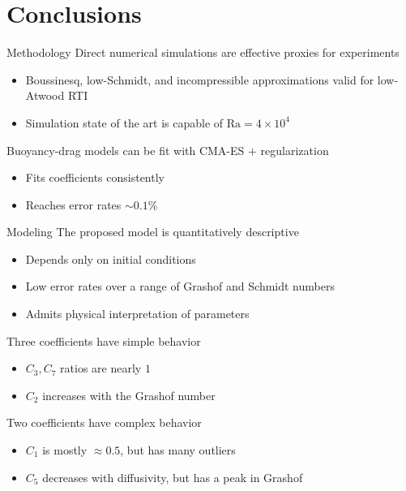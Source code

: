 \documentclass[12pt]{beamer}
\begin{document}
\section{Conclusions}
\begin{frame}{Methodology}
Direct numerical simulations are effective proxies for experiments
\begin{itemize}
  \item Boussinesq, low-Schmidt, and incompressible approximations valid for low-Atwood RTI
  \item Simulation state of the art is capable of $\text{Ra} = 4 \times 10^{4}$
\end{itemize}
\vspace{10pt} \pause

Buoyancy-drag models can be fit with CMA-ES $+$ regularization
\begin{itemize}
  \item Fits coefficients consistently
  \item Reaches error rates $\sim 0.1 \%$
\end{itemize}
\end{frame}

\begin{frame}{Modeling}
The proposed model is quantitatively descriptive
\begin{itemize}
  \item Depends only on initial conditions
  \item Low error rates over a range of Grashof and Schmidt numbers
  \item Admits physical interpretation of parameters
\end{itemize}

Three coefficients have simple behavior
\begin{itemize}
  \item $C_3, C_7$ ratios are nearly $1$
  \item $C_2$ increases with the Grashof number
\end{itemize}

Two coefficients have complex behavior
\begin{itemize}
  \item $C_1$ is mostly $\approx 0.5$, but has many outliers
  \item $C_5$ decreases with diffusivity, but has a peak in Grashof
\end{itemize}
\end{frame}
\end{document}
